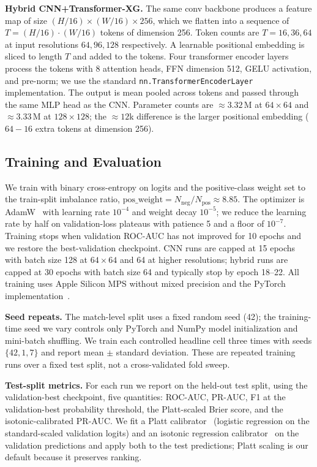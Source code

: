 \documentclass[runningheads,a4paper]{llncs}
\begin{document}
\textbf{Hybrid CNN+Transformer-XG.}
The same conv backbone produces a feature map of size
$(H/16) \times (W/16) \times 256$, which we flatten into a sequence of
$T = (H/16) \cdot (W/16)$ tokens of dimension 256. Token counts are
$T = 16, 36, 64$ at input resolutions $64, 96, 128$ respectively.
A learnable positional embedding is sliced to length $T$ and added to
the tokens. Four transformer encoder layers~\cite{vaswani2017attention}
process the tokens with $8$ attention heads, FFN dimension 512, GELU
activation, and pre-norm; we use the standard
\texttt{nn.TransformerEncoderLayer} implementation. The output is mean
pooled across tokens and passed through the same MLP head as the CNN.
Parameter counts are $\approx 3.32$\,M at $64{\times}64$ and
$\approx 3.33$\,M at $128{\times}128$; the $\approx 12$k difference is
the larger positional embedding ($64 - 16$ extra tokens at dimension
256).

\subsection{Training and Evaluation}
\label{sec:training}

We train with binary cross-entropy on logits and the positive-class
weight set to the train-split imbalance ratio,
$\text{pos\_weight} = N_{\text{neg}} / N_{\text{pos}} \approx 8.85$.
The optimizer is AdamW~\cite{loshchilov2019adamw} with learning rate
$10^{-4}$ and weight decay $10^{-5}$; we reduce the learning rate by
half on validation-loss plateaus with patience 5 and a floor of
$10^{-7}$. Training stops when validation ROC-AUC has not improved for
10 epochs and we restore the best-validation checkpoint. CNN runs are
capped at 15 epochs with batch size 128 at $64{\times}64$ and 64 at
higher resolutions; hybrid runs are capped at 30 epochs with batch size
64 and typically stop by epoch 18--22. All training uses Apple Silicon
MPS without mixed precision and the PyTorch
implementation~\cite{paszke2019pytorch}.

\textbf{Seed repeats.}
The match-level split uses a fixed random seed (42); the training-time
seed we vary controls only PyTorch and NumPy model initialization and
mini-batch shuffling. We train each controlled headline cell three
times with seeds $\{42, 1, 7\}$ and report mean $\pm$ standard
deviation. These are repeated training runs over a fixed test split,
not a cross-validated fold sweep.

\textbf{Test-split metrics.}
For each run we report on the held-out test split, using the
validation-best checkpoint, five quantities: ROC-AUC, PR-AUC, F1 at
the validation-best probability threshold, the Platt-scaled
Brier score, and the isotonic-calibrated PR-AUC. We fit a Platt
calibrator~\cite{platt1999scaling} (logistic regression on the
standard-scaled validation logits) and an isotonic regression
calibrator~\cite{zadrozny2002transforming} on the validation
predictions and apply both to the test predictions; Platt scaling is
our default because it preserves ranking.
\end{document}
